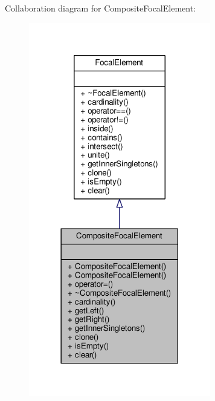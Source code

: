 Collaboration diagram for Composite\+Focal\+Element\+:\nopagebreak
\begin{figure}[H]
\begin{center}
\leavevmode
\includegraphics[width=225pt]{classCompositeFocalElement__coll__graph}
\end{center}
\end{figure}
